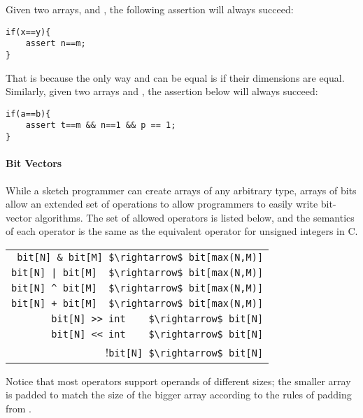 \begin{Example}
Given two arrays,  and , the following assertion will always succeed:
\begin{lstlisting}
if(x==y){
	assert n==m;
}
\end{lstlisting}
That is because the only way  and  can be equal is if their dimensions are equal. Similarly, given two arrays  and , the assertion below will always succeed:
\begin{lstlisting}
if(a==b){
	assert t==m && n==1 && p == 1;
}
\end{lstlisting}
\end{Example}


\paragraph{Bit Vectors}
While a sketch programmer can create arrays of any arbitrary type, arrays of bits allow an extended set of operations to allow programmers to easily write bit-vector algorithms. The set of allowed operators is listed below, and the semantics of each operator is the same as the equivalent operator for unsigned integers in C.
\begin{center}
\begin{tabular}{r}
\lstinline!bit[N] & bit[M] $\rightarrow$ bit[max(N,M)]!\\
\lstinline!bit[N] | bit[M]  $\rightarrow$ bit[max(N,M)]!\\
\lstinline!bit[N] ^ bit[M]  $\rightarrow$ bit[max(N,M)]!\\
\lstinline!bit[N] + bit[M]  $\rightarrow$ bit[max(N,M)]!\\
\lstinline!bit[N] >> int    $\rightarrow$ bit[N]!\\
\lstinline!bit[N] << int    $\rightarrow$ bit[N]!\\
!\lstinline!bit[N] $\rightarrow$ bit[N]!\\
\end{tabular}
\end{center}

Notice that most operators support operands of different sizes; the smaller array is padded to match the size of the bigger array according to the rules of padding from . 





